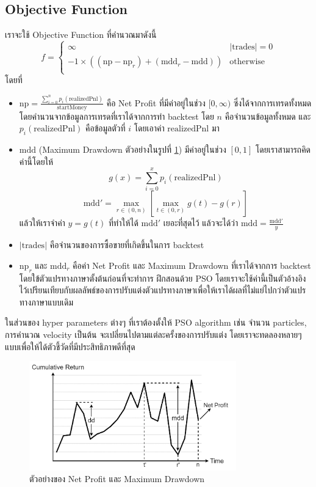 \subsection{Objective Function}
เราจะใช้ Objective Function ที่คำนวณมาดังนี้ 
$$ f = 
\begin{cases}
    \infty & |\text{trades}| = 0 \\
    -1 \times ((\text{np} - \text{np}_r) + (\text{mdd}_r - \text{mdd})) & \text{otherwise} \\ 
\end{cases}
$$ 
โดยที่
\begin{itemize}
    \item {$\text{np} = \frac{\sum_{i=0}^{n} p_i(\text{realizedPnl})}{\text{startMoney}}$ 
        คือ Net Profit ที่มีค่าอยู่ในช่วง $[0, \infty)$ ซึ่งได้จากการเทรดทั้งหมดโดยคำนวนจากข้อมูลการเทรดที่เราได้จากการทำ backtest โดย $n$ คือจำนวนข้อมูลทั้งหมด
        และ $p_i(\text{realizedPnl})$ คือข้อมูลตัวที่ $i$ โดยเอาค่า $\text{realizedPnl}$ มา 
    }
    \item {$\text{mdd}$ (Maximum Drawdown ตัวอย่างในรูปที่ \ref{fig:10}) มีค่าอยู่ในช่วง $[0, 1]$ โดยเราสามารถคิดค่านี้โดยให้ 
    $$
        g(x) = \sum_{i = 0}^{x}p_i(\text{realizedPnl})
    $$
    \begin{equation}
        \text{mdd}' = \max_{r \in (0, n)} \left[ \max_{t \in (0, r)} g(t) - g(r) \right]
    \end{equation}
    แล้วให้เราจำค่า $y = g(t)$ ที่ทำให้ได้ 
    $\text{mdd}'$ เยอะที่สุดไว้ แล้วจะได้ว่า $\text{mdd} = \frac{\text{mdd}'}{y}$
    }
    \item {$|\text{trades}|$ คือจำนวนของการซื้อขายที่เกิดขึ้นในการ backtest}
    \item {$\text{np}_r$ และ  $\text{mdd}_r$ คือค่า Net Profit และ Maximum Drawdown ที่เราได้จากการ backtest โดยใข้ตัวแปรทางภาษาตั้งต้นก่อนที่จะทำการ
    ฝึกสอนด้วย PSO โดยเราจะใช้ค่านี้เป็นตัวอ้างอิงไว้เปรียนเทียบกับผลลัพธ์ของการปรับแต่งตัวแปรทางภาษาเพื่อให้เราได้ผลที่ไม่แย่ไปกว่าตัวแปรทางภาษาแบบเดิม
    }
\end{itemize}
ในส่วนของ hyper parameters ต่างๆ ที่เราต้องตั้งให้ PSO algorithm เช่น จำนวน particles, การคำนวณ velocity เป็นต้น จะเปลี่ยนไปตามแต่ละครั้งของการปรับแต่ง 
โดยเราจะทดลองหลายๆ แบบเพื่อให้ได้ตัวชี้วัดที่มีประสิทธิภาพดีที่สุด

\begin{figure}[ht]
    \centering
    \includegraphics[width=0.8\textwidth]{images/mdd.png}
    \caption{ตัวอย่างของ Net Profit และ Maximum Drawdown}
    \label{fig:10}
\end{figure}

